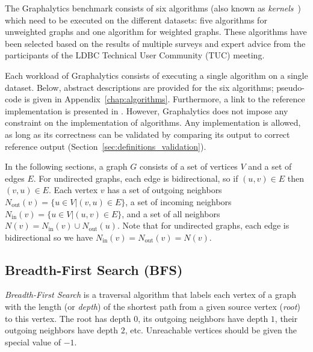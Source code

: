 The Graphalytics benchmark consists of six algorithms (also known as \emph{kernels}~\cite{DBLP:conf/hipc/BaderM05}) which need to be executed on the different datasets: five algorithms for unweighted graphs and one algorithm for weighted graphs. These algorithms have been selected based on the results of multiple surveys and expert advice from the participants of the LDBC Technical User Community (TUC) meeting.

Each workload of Graphalytics consists of executing a single algorithm on a single dataset. Below, abstract descriptions are provided for the six algorithms; pseudo-code is given in Appendix~\ref{chap:algorithms}. Furthermore, a link to the reference implementation is presented in . However, Graphalytics does not impose any constraint on the implementation of algorithms. Any implementation is allowed, as long as its correctness can be validated by comparing its output to correct reference output (Section~\ref{sec:definitions_validation}). 

In the following sections, a graph $G$ consists of a set of vertices $V$ and a set of edges $E$. For undirected graphs, each edge is bidirectional, so if $(u,v)\in E$ then $(v,u)\in E$. Each vertex $v$ has a set of outgoing neighbors
$N_\mathrm{out}(v) = \{u \in V | (v, u) \in E \}$, a set of incoming neighbors
$N_\mathrm{in}(v)  = \{u \in V | (u, v) \in E \}$, and a set of all neighbors
$N(v) = N_\mathrm{in}(v) \cup N_\mathrm{out}(u)$.
Note that for undirected graphs, each edge is bidirectional so we have $N_\mathrm{in}(v) = N_\mathrm{out}(v) = N(v)$.


\subsection{Breadth-First Search (BFS)}
\emph{Breadth-First Search} is a traversal algorithm that labels each vertex of a graph with the length (or \emph{depth}) of the shortest path from a given source vertex (\emph{root}) to this vertex. The root has depth $0$, its outgoing neighbors have depth $1$, their outgoing neighbors have depth $2$, etc. Unreachable vertices should be given the special value of $-1$.


